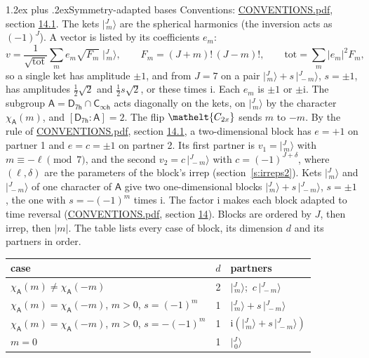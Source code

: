 \documentclass[10pt,a4paper]{article}
\makeatletter
\renewcommand\section{\@startsection{section}{1}{\z@}{-3ex plus -1ex minus -.2ex}%
  {1.2ex plus .2ex}{\normalfont\large\sffamily\bfseries\color{parttitle}}}
\numberwithin{equation}{section}
\newcommand{\eltfont}[1]{{\let\sigma\eltsigma\mathelt{#1}}}
\newcommand{\grp}[1]{\mathsf{#1}}
\newcommand{\elt}[1]{\eltfont{#1}}
\newcommand{\grpindex}[2]{[#1 : #2]}
\newcommand{\iunit}{\mathrm{i}}
\newcommand{\chiA}{\chi_{\grp{A}}}
\newcommand{\jm}[2]{\bigl\lvert{}^{#1}_{\,#2}\bigr\rangle}
\makeatother
\begin{document}
\section{Symmetry-adapted bases}\label{s:bases}
Conventions: \href{../../CONVENTIONS.pdf}{CONVENTIONS.pdf}, section \href{../../CONVENTIONS.pdf\#conv.14.1}{14.1}.
\leavevmode\label{n:index.m}\label{n:vector.ket}The kets $\jm{J}{m}$ are the spherical harmonics (the inversion acts as $(-1)^J$). \label{n:index.ketcoefficient}\label{n:vector.basis.symmetry}\label{n:index.ketweight}\label{n:index.total}A vector is listed by its coefficients $e_m$:
\begin{equation}\label{e:ket}v = \frac{1}{\sqrt{\mathrm{tot}}}\sum_m e_m\sqrt{F_m}\;\jm{J}{m},\qquad F_m = (J+m)!\,(J-m)!,\qquad \mathrm{tot} = \sum_m |e_m|^2F_m,\end{equation}
\leavevmode\label{n:index.pair.sign}so a single ket has amplitude $\pm1$, and from $J = 7$ on a pair $\jm{J}{m} + s\,\jm{J}{-m}$, $s = \pm1$, has amplitudes $\tfrac{1}{2}\sqrt{2}$ and $\tfrac{1}{2}s\sqrt{2}$, or these times $\iunit$. Each $e_m$ is $\pm1$ or $\pm\iunit$.
\leavevmode\label{n:group.A}\label{n:function.character.abelian}The subgroup $\grp{A} = \grp{D_{7h}}\cap\grp{C_{\infty h}}$ acts diagonally on the kets, on $\jm{J}{m}$ by the character $\chiA(m)$, and $\grpindex{\grp{D_{7h}}}{\grp{A}} = 2$. The flip $\elt{C_{2x}}$ sends $m$ to $-m$. \label{n:index.partner.sign}By the rule of \href{../../CONVENTIONS.pdf}{CONVENTIONS.pdf}, section \href{../../CONVENTIONS.pdf\#conv.14.1}{14.1}, a two-dimensional block has $e = +1$ on partner 1 and $e = c = \pm1$ on partner 2. Its first partner is $v_1 = \jm{J}{m}$ with $m \equiv -\ell \pmod{7}$, and the second $v_2 = c\,\jm{J}{-m}$ with $c = (-1)^{J+\delta}$, where $(\ell, \delta)$ are the parameters of the block's irrep (section~\ref{s:irreps2}). Kets $\jm{J}{m}$ and $\jm{J}{-m}$ of one character of $\grp{A}$ give two one-dimensional blocks $\jm{J}{m} + s\,\jm{J}{-m}$, $s = \pm1$, the one with $s = -(-1)^m$ times $\iunit$. The factor $\iunit$ makes each block adapted to time reversal (\href{../../CONVENTIONS.pdf}{CONVENTIONS.pdf}, section \href{../../CONVENTIONS.pdf\#conv.14}{14}). Blocks are ordered by $J$, then irrep, then $|m|$.
\leavevmode\label{n:head.case}\label{n:head.partners}The table lists every case of block, its dimension $d$ and its partners in order.
\begin{center}\begin{tabular}{@{}lrl@{}}\toprule
case & $d$ & partners\\\midrule
$\chiA(m) \ne \chiA(-m)$ & 2 & $\jm{J}{m}$;\ $c\,\jm{J}{-m}$\\
$\chiA(m) = \chiA(-m)$, $m > 0$, $s = (-1)^m$ & 1 & $\jm{J}{m} + s\,\jm{J}{-m}$\\
$\chiA(m) = \chiA(-m)$, $m > 0$, $s = -(-1)^m$ & 1 & $\iunit(\jm{J}{m} + s\,\jm{J}{-m})$\\
$m = 0$ & 1 & $\jm{J}{0}$\\
\bottomrule\end{tabular}\end{center}
\end{document}
